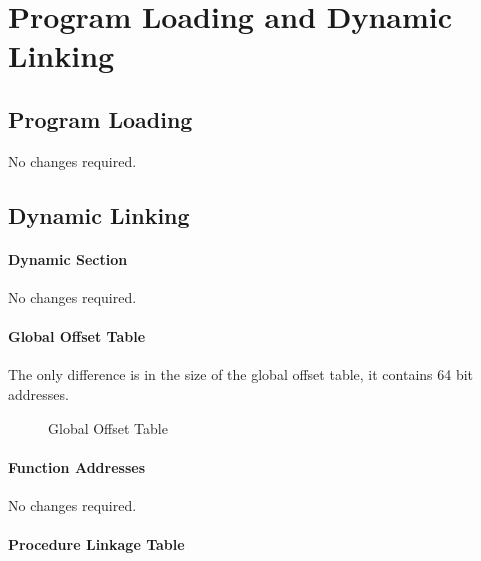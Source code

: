 \chapter{Program Loading and Dynamic Linking}

\section{Program Loading}

No changes required.


\section{Dynamic Linking}

\subsubsection{Dynamic Section}

No changes required.

\subsubsection{Global Offset Table}

The only difference is in the size of the global offset table, it
contains 64 bit addresses.

\begin{figure}[H]
\Hrule
\caption{Global Offset Table}
\begin{center}
\end{center}
\Hrule
\end{figure}

\subsubsection{Function Addresses}

No changes required.

\subsubsection{Procedure Linkage Table}



